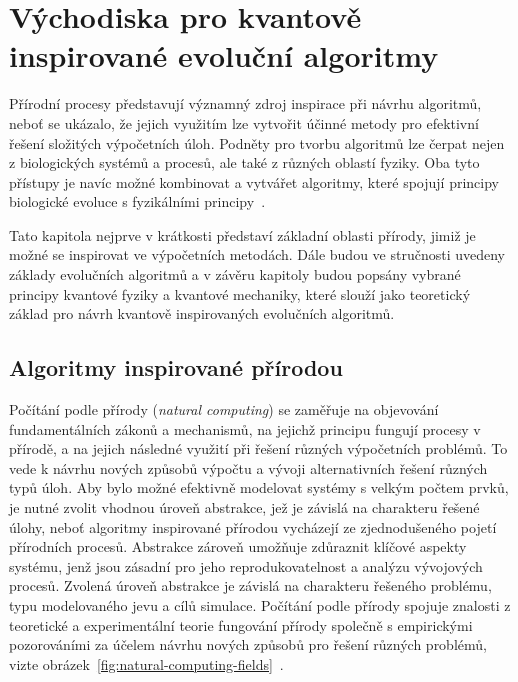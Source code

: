 \chapter{Východiska pro kvantově inspirované evoluční algoritmy}
Přírodní procesy představují významný zdroj inspirace při návrhu algoritmů, neboť se ukázalo, že jejich využitím lze vytvořit účinné metody pro efektivní řešení složitých výpočetních úloh.
Podněty pro tvorbu algoritmů lze čerpat nejen z biologických systémů a procesů, ale také z různých oblastí fyziky. 
Oba tyto přístupy je navíc možné kombinovat a vytvářet algoritmy, které spojují principy biologické evoluce s fyzikálními principy~\cite{NaturalComputing,NaturalComputing-handbook}.

Tato kapitola nejprve v krátkosti představí základní oblasti přírody, jimiž je možné se inspirovat ve výpočetních metodách. 
Dále budou ve stručnosti uvedeny základy evolučních algoritmů a v závěru kapitoly budou popsány vybrané principy kvantové fyziky a kvantové mechaniky, které slouží jako teoretický základ pro návrh kvantově inspirovaných evolučních algoritmů. 

\section{Algoritmy inspirované přírodou}
Počítání podle přírody (\emph{natural computing}) se zaměřuje na objevování fundamentálních zákonů a mechanismů, na jejichž principu fungují procesy v přírodě, a na jejich následné využití při řešení různých výpočetních problémů. 
To vede k návrhu nových způsobů výpočtu a vývoji alternativních řešení různých typů úloh. 
Aby bylo možné efektivně modelovat systémy s velkým počtem prvků, je nutné zvolit vhodnou úroveň abstrakce, jež je závislá na charakteru řešené úlohy, neboť algoritmy inspirované přírodou vycházejí ze zjednodušeného pojetí přírodních procesů. 
Abstrakce zároveň umožňuje zdůraznit klíčové aspekty systému, jenž jsou zásadní pro jeho reprodukovatelnost a analýzu vývojových procesů. 
Zvolená úroveň abstrakce je závislá na charakteru řešeného problému, typu modelovaného jevu a cílů simulace. 
Počítání podle přírody spojuje znalosti z teoretické a experimentální teorie fungování přírody společně s empirickými pozorováními za účelem návrhu nových způsobů pro řešení různých problémů, vizte obrázek~\ref{fig:natural-computing-fields}~\cite{FundamentalNatural}.

